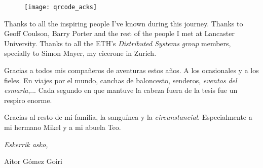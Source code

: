 \begin{acknowledgements}
\begin{figure}[h]
    \centering
    \texttt{[image: qrcode\_acks]}
\end{figure}


Thanks to all the inspiring people I've known during this journey.
Thanks to Geoff Coulson, Barry Porter and the rest of the people I met at Lancaster University.
Thanks to all the ETH's \emph{Distributed Systems group} members, specially to Simon Mayer, my cicerone in Zurich.


Gracias a todos mis compañeros de aventuras estos años.
A los ocasionales y a los fieles.
En viajes por el mundo, canchas de baloncesto, senderos, \emph{eventos del esmarla},...
Cada segundo en que mantuve la cabeza fuera de la tesis fue un respiro enorme.


Gracias al resto de mi familia, la sanguínea y la \emph{circunstancial}.
Especialmente a mi hermano Mikel y a mi abuela Teo.


\begin{flushright}
\textit{Eskerrik asko,}

Aitor Gómez Goiri

\monthname \ \the\year



\end{flushright}

\begin{listing}[nolol]
  \scriptsize
  
  \label{lst:workmates_ack}
\end{listing}



\end{acknowledgements}



